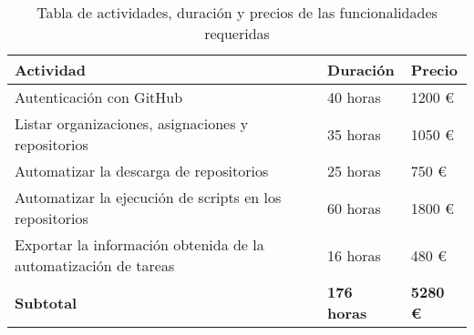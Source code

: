 \begin{table}[!ht]
\begin{center}
\begin{tabular}{|p{80mm}|p{25mm}|p{20mm}|} \hline 
\textbf{Actividad} & \textbf{Duración} & \textbf{Precio} \\ \hline

Autenticación con GitHub &
40 horas &
1200 \euro{}
\\
\hline

Listar organizaciones, asignaciones y repositorios &
35 horas &
1050 \euro{}
\\
\hline

Automatizar la descarga de repositorios &
25 horas &
750 \euro{}
\\
\hline

Automatizar la ejecución de scripts en los repositorios &
60 horas &
1800 \euro{}
\\
\hline

Exportar la información obtenida de la automatización de tareas &
16 horas &
480 \euro{}
\\
\hline \hline

{\bfseries Subtotal} &
{\bfseries 176 horas} &
{\bfseries 5280 \euro{}}
\\
\hline

\end{tabular}
\end{center}
\caption{Tabla de actividades, duración y precios de las funcionalidades requeridas}
\label{table:resOthers1}
\end{table}

